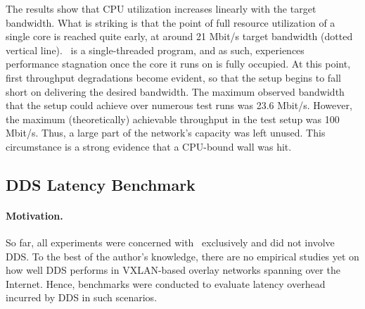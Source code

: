 The results show that CPU utilization increases linearly with the target bandwidth. What is striking is that the point of full resource utilization of a single core is reached quite early, at around 21 Mbit/s target bandwidth (dotted vertical line). \wnet\ is a single-threaded program, and as such, experiences performance stagnation once the core it runs on is fully occupied. At this point, first throughput degradations become evident, so that the setup begins to fall short on delivering the desired bandwidth. The maximum observed bandwidth that the setup could achieve over numerous test runs was 23.6 Mbit/s.
However, the maximum (theoretically) achievable throughput in the test setup was 100 Mbit/s. Thus, a large part of the network's capacity was left unused. This circumstance is a strong evidence that a CPU-bound wall was hit.
%
%
%
%
%
%
%
%
%
%

\subsection{DDS Latency Benchmark} \label{sec:ddslatency}

\paragraph{Motivation.} So far, all experiments were concerned with \wnet\ exclusively and did not involve DDS. To the best of the author's knowledge, there are no empirical studies yet on how well DDS performs in VXLAN-based overlay networks spanning over the Internet. Hence, benchmarks were conducted to evaluate latency overhead incurred by DDS in such scenarios.

